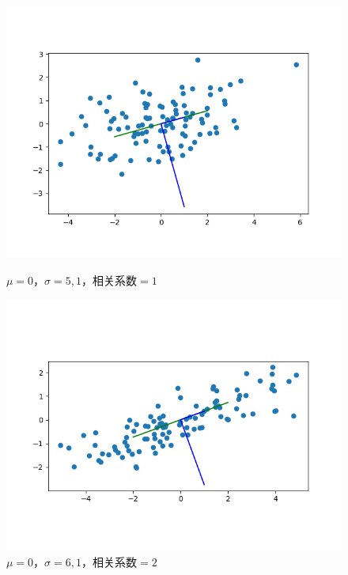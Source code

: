 \begin{figure}[htbp]
    \begin{minipage}[t]{0.3\linewidth}
        \centering
        \includegraphics[width=\textwidth]{figures/Figure_10.png}
        \caption{$\mu=0$，$\sigma=5,1$，相关系数$=1$}
        \label{10}
    \end{minipage}
    \begin{minipage}[t]{0.3\linewidth}
        \centering
        \includegraphics[width=\textwidth]{figures/Figure_11.png}
        \caption{$\mu=0$，$\sigma=6,1$，相关系数$=2$}
        \label{11}
    \end{minipage}
    \begin{minipage}[t]{0.3\linewidth}
        \centering

\end{minipage}
\end{figure}
